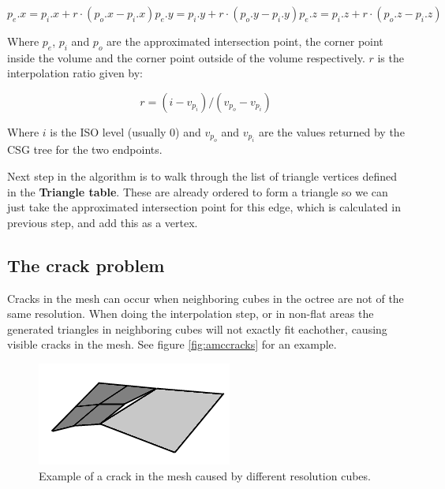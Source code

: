 \documentclass[a4paper,10pt,twoside]{report}
\begin{document}
\begin{equation}
    p_e.x = p_i.x + r \cdot (p_o.x - p_i.x)
    p_e.y = p_i.y + r \cdot (p_o.y - p_i.y)
    p_e.z = p_i.z + r \cdot (p_o.z - p_i.z)
\end{equation}

Where $p_e$, $p_i$ and $p_o$ are the approximated intersection point, the corner point inside the volume and the corner point outside of the volume respectively. $r$ is the interpolation ratio given by:

\begin{equation}
    r = (i - v_{p_i}) / (v_{p_o} - v_{p_i})
\end{equation}

Where $i$ is the ISO level (usually 0) and $v_{p_o}$ and $v_{p_i}$ are the values returned by the CSG tree for the two endpoints.

Next step in the algorithm is to walk through the list of triangle vertices defined in the \textbf{Triangle table}. These are already ordered to form a triangle so we can just take the approximated intersection point for this edge, which is calculated in previous step, and add this as a vertex.

\subsection{The crack problem}

Cracks in the mesh can occur when neighboring cubes in the octree are not of the same resolution. When doing the interpolation step, or in non-flat areas the generated triangles in neighboring cubes will not exactly fit eachother, causing visible cracks in the mesh. See figure \ref{fig:amccracks} for an example.

    \begin{figure}[h]
        \begin{center}
            \includegraphics[scale=0.8]{./images/amccrack}
        \end{center}
        \caption{Example of a crack in the mesh caused by different resolution cubes.}
        \label{figure:amccracks}
    \end{figure}
\end{document}
